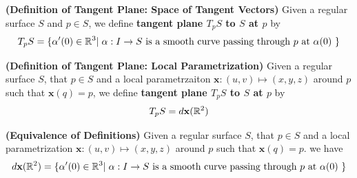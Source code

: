 \documentclass{report}
\begin{document}
\begin{definition}
\textbf{(Definition of Tangent Plane: Space of Tangent Vectors)} Given a regular surface $S$ and $p\in  S$, we define \textbf{tangent plane $T_pS$ to $S$ at $p$} by 
\begin{align*}
T_pS=\{ \alpha '(0)\in\mathbb{R}^3|\hspace{0.1cm}\alpha:I\rightarrow S \text{ is a smooth curve  passing through $p$ at $\alpha (0)$ } \}
\end{align*}
\end{definition}
\begin{definition}
\textbf{(Definition of Tangent Plane: Local Parametrization)} Given a regular surface $S$, that $p\in  S$ and a local parametrzaiton $\textbf{x}:(u,v)\mapsto  (x,y,z)$ around $p$ such that $\textbf{x}(q)=p$,  we define \textbf{tangent plane $T_pS$ to  $S$ at $p$} by 
\begin{align*}
T_pS=d\textbf{x}(\mathbb{R}^2)
\end{align*}
\end{definition}
\begin{theorem}
\textbf{(Equivalence of Definitions)} Given a regular surface $S$, that $p\in  S $ and a local parametrization $\textbf{x}:(u,v)\mapsto  (x,y,z)$ around $p$ such that $\textbf{x}(q)=p$. we have 
\begin{align*}
d\textbf{x}(\mathbb{R}^2)=\{ \alpha '(0)\in\mathbb{R}^3|\hspace{0.1cm}\alpha:I\rightarrow S \text{ is a smooth curve  passing through $p$ at $\alpha (0)$ } \}
\end{align*}
\end{theorem}
\end{document}
